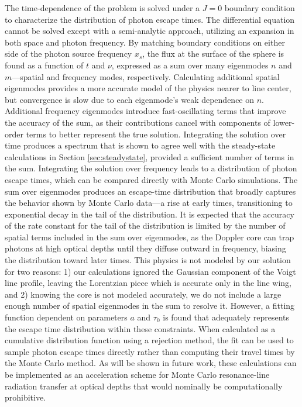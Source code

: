 \documentclass{aastex63}
\begin{document}
The time-dependence of the problem is solved under a $J=0$ boundary condition to characterize the distribution of photon escape times. The differential equation cannot be solved except with a semi-analytic approach, utilizing an expansion in both space and photon frequency. By matching boundary conditions on either side of the photon source frequency $x_s$, the flux at the surface of the sphere is found as a function of $t$ and $\nu$, expressed as a sum over many eigenmodes $n$ and $m$---spatial and frequency modes, respectively. Calculating additional spatial eigenmodes provides a more accurate model of the physics nearer to line center, but convergence is slow due to each eigenmode's weak dependence on $n$. Additional frequency eigenmodes introduce fast-oscillating terms that improve the accuracy of the sum, as their contributions cancel with components of lower-order terms to better represent the true solution. Integrating the solution over time produces a spectrum that is shown to agree well with the steady-state calculations in Section \ref{sec:steadystate}, provided a sufficient number of terms in the sum. Integrating the solution over frequency leads to a distribution of photon escape times, which can be compared directly with Monte Carlo simulations. The sum over eigenmodes produces an escape-time distribution that broadly captures the behavior shown by Monte Carlo data---a rise at early times, transitioning to exponential decay in the tail of the distribution. It is expected that the accuracy of the rate constant for the tail of the distribution is limited by the number of spatial terms included in the sum over eigenmodes, as the Doppler core can trap photons at high optical depths until they diffuse outward in frequency, biasing the distribution toward later times. This physics is not modeled by our solution for two reasons: 1) our calculations ignored the Gaussian component of the Voigt line profile, leaving the Lorentzian piece which is accurate only in the line wing, and 2) knowing the core is not modeled accurately, we do not include a large enough number of spatial eigenmodes in the sum to resolve it. However, a fitting function dependent on parameters $a$ and $\tau_0$ is found that adequately represents the escape time distribution within these constraints. When calculated as a cumulative distribution function using a rejection method, the fit can be used to sample photon escape times directly rather than computing their travel times by the Monte Carlo method. As will be shown in future work, these calculations can be implemented as an acceleration scheme for Monte Carlo resonance-line radiation transfer at optical depths that would nominally be computationally prohibitive.
\end{document}
